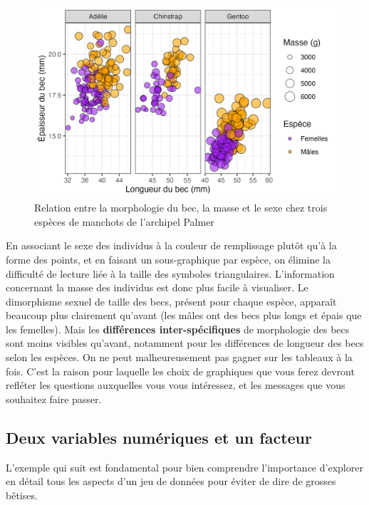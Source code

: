 \documentclass[
  letterpaper,
  DIV=11,
  numbers=noendperiod]{scrreprt}
\begin{document}
\begin{figure}

{\centering \includegraphics{./03-visualization_files/figure-pdf/fig-multivar-1.png}

}

\caption{\label{fig-multivar}Relation entre la morphologie du bec, la
masse et le sexe chez trois espèces de manchots de l'archipel Palmer}

\end{figure}

En associant le sexe des individus à la couleur de remplissage plutôt
qu'à la forme des points, et en faisant un sous-graphique par espèce, on
élimine la difficulté de lecture liée à la taille des symboles
triangulaires. L'information concernant la masse des individus est donc
plus facile à visualiser. Le dimorphisme sexuel de taille des becs,
présent pour chaque espèce, apparaît beaucoup plus clairement qu'avant
(les mâles ont des becs plus longs et épais que les femelles). Mais les
\textbf{différences inter-spécifiques} de morphologie des becs sont
moins visibles qu'avant, notamment pour les différences de longueur des
becs selon les espèces. On ne peut malheureusement pas gagner sur les
tableaux à la fois. C'est la raison pour laquelle les choix de
graphiques que vous ferez devront refléter les questions auxquelles vous
vous intéressez, et les messages que vous souhaitez faire passer.

\hypertarget{sec-simpson}{%
\subsection{Deux variables numériques et un facteur}\label{sec-simpson}}

L'exemple qui suit est fondamental pour bien comprendre l'importance
d'explorer en détail tous les aspects d'un jeu de données pour éviter de
dire de grosses bêtises.
\end{document}
